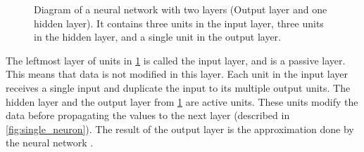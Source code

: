 \begin{figure}[H]
  \centering

    \caption{Diagram of a neural network with two layers (Output layer and one hidden layer). It contains three units in the input layer, three units in the hidden layer, and a single unit in the output layer. }
    \label{fig:single_layered_neural_network}
\end{figure}


The leftmost layer of units in \ref{fig:single_layered_neural_network} is called the input layer, and is a passive layer. This means that data is not modified in this layer. Each unit in the input layer receives a single input and duplicate the input to its multiple output units. The hidden layer and the output layer from \ref{fig:single_layered_neural_network} are active units. These units modify the data before propagating the values to the next layer (described in \ref{fig:single_neuron}). The result of the output layer is the approximation done by the neural network \parencite{smith_scientist_1997}. 

